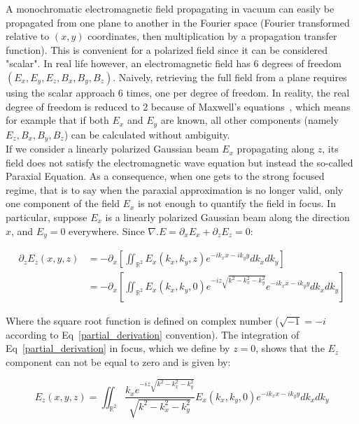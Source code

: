 A monochromatic electromagnetic field propagating in vacuum can easily be propagated from one plane to another in the Fourier space (Fourier transformed relative to $(x,y)$ coordinates, then multiplication by a propagation transfer function). This is convenient for a polarized field since it can be considered "scalar". In real life however, an electromagnetic field has 6 degrees of freedom $(E_x,E_y,E_z,B_x,B_y,B_z)$. Naively, retrieving the full field from a plane requires using the scalar approach 6 times, one per degree of freedom. In reality, the real degree of freedom is reduced to 2 because of Maxwell's equations~\cite{pHdQuesnel}, which means for example that if both $E_x$ and $E_y$ are known, all other components (namely $E_z,B_x,B_y,B_z$) can be calculated without ambiguity. \\


\noindent If we consider a linearly polarized Gaussian beam $E_x$ propagating along $z$, its field does not satisfy the electromagnetic wave equation but instead the so-called Paraxial Equation. As a consequence, when one gets to the strong focused regime, that is to say when the paraxial approximation is no longer valid, only one component of the field $E_x$ is not enough to quantify the field in focus. In particular, suppose $E_x$ is a linearly polarized Gaussian beam along the direction $x$, and $E_y =0$ everywhere. Since $\nabla. E = \partial_xE_x +\partial_z E_z= 0$:

\begin{equation}\label{partial_derivation}
\begin{split}
\partial_z E_z(x,y,z) &=-\partial_x [\iint_{\mathbb{R}^2}E_x(k_x,k_y,z)e^{-ik_xx-ik_yy} dk_xdk_y] \\
 & =-\partial_x [\iint_{\mathbb{R}^2}E_x(k_x,k_y,0)e^{-iz\sqrt{k^2 - k_x^2-k_y^2}}e^{-ik_xx-ik_yy} dk_xdk_y] 
\end{split}
\end{equation}

\noindent Where the square root function is defined on complex number ($\sqrt{-1} = - i$ according to Eq~\ref{partial_derivation} convention). The integration of Eq~\ref{partial_derivation} in focus, which we define by $z=0$, shows that the $E_z$ component can not be equal to zero and is given by:


\begin{equation}\label{Ez_comp}
 E_z(x,y,z) = \iint_{\mathbb{R}^2}\frac{k_xe^{-iz\sqrt{k^2 - k_x^2-k_y^2}}}{\sqrt{k^2 - k_x^2-k_y^2}}E_x(k_x,k_y,0)e^{-ik_xx-ik_yy} dk_xdk_y
\end{equation}

